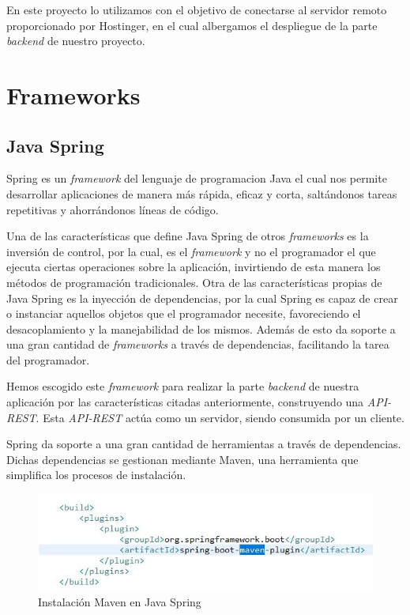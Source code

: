      En este proyecto lo utilizamos con el objetivo de conectarse al servidor remoto proporcionado por Hostinger\cite{hostinger}, en el cual albergamos el despliegue de la parte \textit{backend} de nuestro proyecto.\newpage
     
     
     \section{Frameworks}
     
     \subsection{Java Spring}
     Spring\cite{javaspring} es un \textit{framework} del lenguaje de programacion Java el cual nos permite desarrollar aplicaciones de manera más rápida, eficaz y corta, saltándonos tareas repetitivas y ahorrándonos líneas de código.
     \newline
     
     Una de las características que define  Java Spring de otros \textit{frameworks} es la inversión de control, por la cual, es el \textit{framework} y no el programador el que ejecuta ciertas operaciones sobre la aplicación, invirtiendo de esta manera los métodos de programación tradicionales.
     Otra de las características propias de Java Spring es la inyección de dependencias, por la cual Spring es capaz de crear o instanciar aquellos objetos que el programador necesite, favoreciendo el desacoplamiento y la manejabilidad de los mismos.
     Además de esto da soporte a una gran cantidad de \textit{frameworks} a través de dependencias, facilitando la tarea del programador.
     \newline
     
     Hemos escogido este \textit{framework} para realizar la parte \textit{backend} de nuestra aplicación por las características citadas anteriormente, construyendo una \textit{API-REST}. Esta \textit{API-REST} actúa como un servidor, siendo consumida por un cliente.
     \newline
    
    Spring da soporte a una gran cantidad de herramientas a través de dependencias. Dichas dependencias se gestionan mediante Maven\cite{maven}, una herramienta que simplifica los procesos de instalación.
    
    \begin{figure}[h]
    \centering
    \includegraphics[width=1\textwidth]{images/maven}
    \caption{Instalación Maven en Java Spring}
    \end{figure}
    
